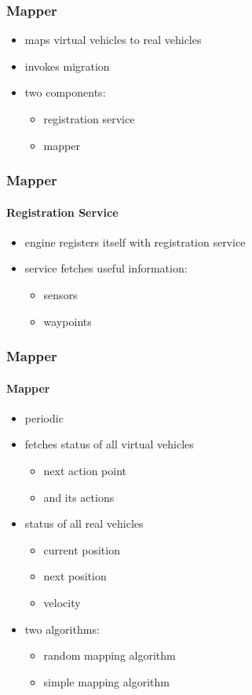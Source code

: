 \documentclass{beamer}
\begin{document}
\begin{frame}\frametitle{Mapper}
	\begin{itemize}
		\item maps virtual vehicles to real vehicles 
		\item invokes migration
		\item two components:
			\begin{itemize}
				\item registration service
				\item mapper
			\end{itemize}
	\end{itemize} 
\end{frame}

\begin{frame}\frametitle{Mapper}\framesubtitle{Registration Service}
	\begin{itemize}
		\item engine registers itself with registration service
		\item service fetches useful information:
		\begin{itemize}
			\item sensors
			\item waypoints
		\end{itemize}
	\end{itemize} 
\end{frame}

\begin{frame}\frametitle{Mapper}\framesubtitle{Mapper}
	\begin{itemize}
		\item periodic
		\item fetches status of all virtual vehicles
		\begin{itemize}
			\item next action point
			\item and its actions
		\end{itemize}
		\item status of all real vehicles
		\begin{itemize}
			\item current position
			\item next position
			\item velocity
		\end{itemize}
		\item two algorithms:
		\begin{itemize}
			\item random mapping algorithm
			\item simple mapping algorithm
		\end{itemize}
	\end{itemize} 
\end{frame}
\end{document}
